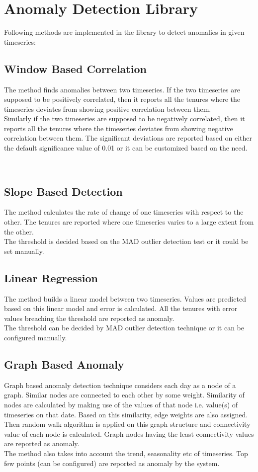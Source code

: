 \section{Anomaly Detection Library}
Following methods are implemented in the library to detect anomalies in given timeseries:
\\

\subsection{Window Based Correlation}
The method finds anomalies between two timeseries. If the two timeseries are supposed to be positively correlated, then it reports all the tenures where the timeseries deviates from showing positive correlation between them.
\\
Similarly if the two timeseries are supposed to be negatively correlated, then it reports all the tenures where the timeseries deviates from showing negative correlation between them. The significant deviations are reported based on either the default significance value of 0.01 or it can be customized based on the need.

\
\subsection{Slope Based Detection}
The  method calculates the rate of change of one timeseries with respect to the other. The tenures are reported where one timeseries varies to a large extent from the other.
\\
The threshold is decided based on the MAD outlier detection test or it could be set manually.
\subsection{Linear Regression}
The method builds a linear model between two timeseries. Values are predicted based on this linear model and error is calculated. All the tenures with error values breaching the threshold are reported as anomaly. 
\\
The threshold can be decided by MAD outlier detection technique or it can be configured manually.
\subsection{Graph Based Anomaly}
Graph based anomaly detection technique considers each day as a node of a graph. Similar nodes are connected to each other by some weight. Similarity of nodes are calculated by making use of the values of that node i.e. value(s) of timeseries on that date. Based on this similarity, edge weights are also assigned. Then random walk algorithm is applied on this graph structure and connectivity value of each node is calculated. Graph nodes having the least connectivity values are reported as anomaly.
\\
The method also takes into account the trend, seasonality etc of timeseries. Top few points (can be configured) are reported as anomaly by the system.
